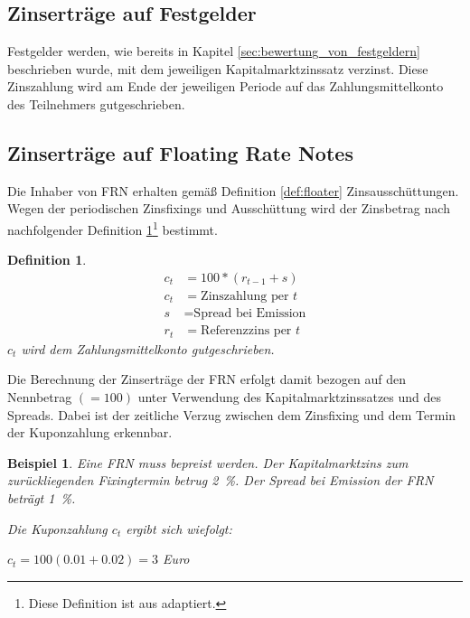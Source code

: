 \documentclass[12pt, a4paper]{article}
\theoremstyle{plain}
\newtheorem{definition}{Definition}
\newtheorem{example}{Beispiel}
\begin{document}
\subsection{Zinserträge auf Festgelder}
\label{sec:zinsertraege_auf_festgelder}
Festgelder werden, wie bereits in Kapitel \ref{sec:bewertung_von_festgeldern} beschrieben wurde, mit dem jeweiligen Kapitalmarktzinssatz verzinst. Diese Zinszahlung wird am Ende der jeweiligen Periode auf das Zahlungsmittelkonto des Teilnehmers gutgeschrieben.

\subsection{Zinserträge auf Floating Rate Notes}
\label{sec:zinsertraege_auf_floating_rate_notes}

Die Inhaber von \gls{FRN} erhalten gemäß Definition \ref{def:floater} Zinsausschüttungen.
Wegen der periodischen Zinsfixings und Ausschüttung wird der Zinsbetrag nach nachfolgender Definition \ref{def:zins_floater}\footnote{Diese Definition ist aus \textcite[][S.~52]{veronesi_fixed_2010} adaptiert.} bestimmt.

\begin{definition}
	\label{def:zins_floater}
\begin{align*}
	c_t &= 100 * (r_{t-1} + s)\\
	c_t &= \text{Zinszahlung per $t$}\\
	s &= \text{Spread bei Emission}\\
	r_t &= \text{Referenzzins per $t$}
\end{align*}
$c_t$ wird dem Zahlungsmittelkonto gutgeschrieben.
\end{definition}

Die Berechnung der Zinserträge der \gls{FRN} erfolgt damit bezogen auf den Nennbetrag $(= 100)$ unter Verwendung des Kapitalmarktzinssatzes und des Spreads. Dabei ist der zeitliche Verzug zwischen dem Zinsfixing und dem Termin der Kuponzahlung erkennbar.

\begin{example}
	Eine \gls{FRN} muss bepreist werden. Der Kapitalmarktzins zum zurückliegenden Fixingtermin betrug 2~\%. Der \textit{Spread} bei Emission der \gls{FRN} beträgt 1~\%. 
	
	Die Kuponzahlung $c_t$ ergibt sich wiefolgt:

	$c_t= 100 (0.01 + 0.02) = 3 $ Euro
\end{example}
\clearpage
\printbibliography[title={Literatur}]
\end{document}
